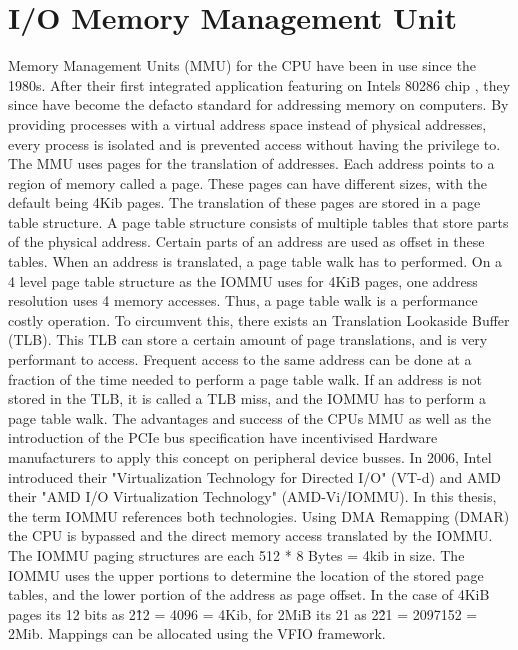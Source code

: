 \section{I/O Memory Management Unit}
Memory Management Units (MMU) for the CPU have been in use since the 1980s. After their first integrated application featuring on Intels 80286 chip \cite{intel80286}, they since have become the defacto standard for addressing memory on computers. By providing processes with a virtual address space instead of physical addresses, every process is isolated and is prevented access without having the privilege to. The MMU uses pages for the translation of addresses. Each address points to a region of memory called a page. These pages can have different sizes, with the default being 4Kib pages.
The translation of these pages are stored in a page table structure. A page table structure consists of multiple tables that store parts of the physical address. Certain parts of an address are used as offset in these tables. When an address is translated, a page table walk has to performed. On a 4 level page table structure as the IOMMU uses for 4KiB pages, one address resolution uses 4 memory accesses. Thus, a page table walk is a performance costly operation. To circumvent this, there exists an Translation Lookaside Buffer (TLB). This TLB can store a certain amount of page translations, and is very performant to access. Frequent access to the same address can be done at a fraction of the time needed to perform a page table walk. If an address is not stored in the TLB, it is called a TLB miss, and the IOMMU has to perform a page table walk.
The advantages and success of the CPUs MMU as well as the introduction of the PCIe bus specification have incentivised Hardware manufacturers to apply this concept on peripheral device busses. In 2006, Intel introduced their "Virtualization Technology for Directed I/O" (VT-d) and AMD their "AMD I/O Virtualization Technology" (AMD-Vi/IOMMU). In this thesis, the term IOMMU references both technologies.
Using DMA Remapping (DMAR) the CPU is bypassed and the direct memory access translated by the IOMMU.
The IOMMU paging structures are each 512 * 8 Bytes = 4kib in size. The IOMMU uses the upper portions to determine the location of the stored page tables, and the lower portion of the address as page offset. In the case of 4KiB pages its 12 bits as 2\^12 = 4096 = 4Kib, for 2MiB its 21 as 2\^21 = 2097152 = 2Mib.
Mappings can be allocated using the VFIO framework.

